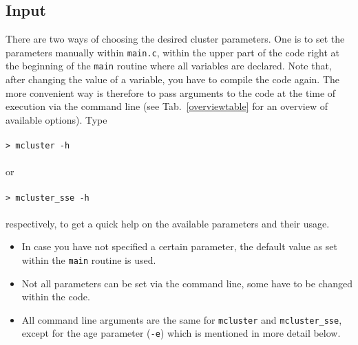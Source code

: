 \documentclass[useAMS,usenatbib]{mn2e}
\begin{document}
\subsection*{Input}
There are two ways of choosing the desired cluster parameters. One is to set the parameters manually within \texttt{main.c}, within the upper part of the code right at the beginning of the \texttt{main} routine where all variables are declared. Note that, after changing  the value of a variable, you have to compile the code again. The more convenient way is therefore to pass arguments to the code at the time of execution via the command line (see Tab.~\ref{overviewtable} for an overview of available options). Type\\\\
\texttt{> mcluster -h\\\\}
or\\\\
\texttt{> mcluster\_sse -h\\\\}
respectively, to get a quick help on the available parameters and their usage. 
\begin{itemize}
\item In case you have not specified a certain parameter, the default value as set within the \texttt{main} routine is used.
\item Not all parameters can be set via the command line, some have to be changed within the code.
\item All command line arguments are the same for \texttt{mcluster} and \texttt{mcluster\_sse}, except for the age parameter (\texttt{-e}) which is mentioned in more detail below.
\end{itemize}
 
\end{document}
